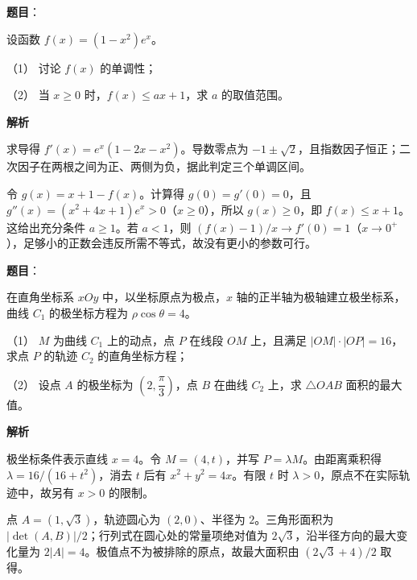 \begin{answer}

\textbf{题目}：

设函数 \(f(x)=(1-x^2)e^x\)。

（1） 讨论 \(f(x)\) 的单调性；

（2） 当 \(x\ge0\) 时，\(f(x)\le ax+1\)，求 \(a\) 的取值范围。

\textbf{解析}


求导得 \(f'(x)=e^x(1-2x-x^2)\)。导数零点为 \(-1\pm\sqrt2\)，且指数因子恒正；二次因子在两根之间为正、两侧为负，据此判定三个单调区间。


令 \(g(x)=x+1-f(x)\)。计算得 \(g(0)=g'(0)=0\)，且 \(g''(x)=(x^2+4x+1)e^x>0\)（\(x\ge0\)），所以 \(g(x)\ge0\)，即 \(f(x)\le x+1\)。这给出充分条件 \(a\ge1\)。若 \(a<1\)，则 \((f(x)-1)/x\to f'(0)=1\)（\(x\to0^+\)），足够小的正数会违反所需不等式，故没有更小的参数可行。


\gkanswer{答案（2）：\(a\in[1,+\infty)\)（D）}

\end{answer}
\begin{answer}

\textbf{题目}：

在直角坐标系 \(xOy\) 中，以坐标原点为极点，\(x\) 轴的正半轴为极轴建立极坐标系，曲线 \(C_1\) 的极坐标方程为 \(\rho\cos\theta=4\)。

（1） \(M\) 为曲线 \(C_1\) 上的动点，点 \(P\) 在线段 \(OM\) 上，且满足 \(|OM|\cdot|OP|=16\)，求点 \(P\) 的轨迹 \(C_2\) 的直角坐标方程；

（2） 设点 \(A\) 的极坐标为 \(\left(2,\dfrac{\pi}{3}\right)\)，点 \(B\) 在曲线 \(C_2\) 上，求 \(\triangle OAB\) 面积的最大值。

\textbf{解析}


极坐标条件表示直线 \(x=4\)。令 \(M=(4,t)\)，并写 \(P=\lambda M\)。由距离乘积得 \(\lambda=16/(16+t^2)\)，消去 \(t\) 后有 \(x^2+y^2=4x\)。有限 \(t\) 时 \(\lambda>0\)，原点不在实际轨迹中，故另有 \(x>0\) 的限制。


点 \(A=(1,\sqrt3)\)，轨迹圆心为 \((2,0)\)、半径为 \(2\)。三角形面积为 \(|\det(A,B)|/2\)；行列式在圆心处的常量项绝对值为 \(2\sqrt3\)，沿半径方向的最大变化量为 \(2|A|=4\)。极值点不为被排除的原点，故最大面积由 \((2\sqrt3+4)/2\) 取得。



\end{answer}
